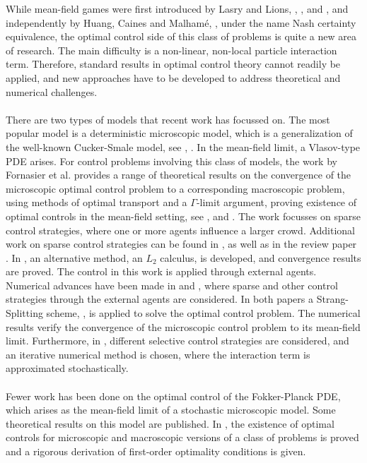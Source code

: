 While mean-field games were first introduced by Lasry and Lions, \cite{LASRY2006619}, \cite{LASRY2006679},\cite{LASRY4} and \cite{Lasry2007}, and independently by Huang, Caines and Malham\'e,  \cite{Huang1}, under the name Nash certainty equivalence, the optimal control side of this class of problems is quite a new area of research. The main difficulty is a non-linear, non-local particle interaction term. Therefore, standard results in optimal control theory cannot readily be applied, and new approaches have to be developed to address theoretical and numerical challenges.
\\
\\
There are two types of models that recent work has focussed on. The most popular model is a deterministic microscopic model, which is a generalization of the well-known Cucker-Smale model, see \cite{CuckerSmale1}, \cite{CuckerSmale2}. In the mean-field limit, a Vlasov-type PDE arises. For control problems involving this class of models, the work by Fornasier et al. provides a range of theoretical results on the convergence of the microscopic optimal control problem to a corresponding macroscopic problem, using methods of optimal transport and a $\Gamma$-limit argument, proving existence of optimal controls in the mean-field setting, see \cite{Fornasier_2014},
\cite{Fornasier_2014no2}
and \cite{fornasier_lisini_orrieri_savare_2019}. The work focusses on sparse control strategies, where one or more agents influence a larger crowd.
Additional work on sparse control strategies can be found in \cite{piccoli2014no1}, as well as in the review paper \cite{Fornasier_20161no1}.
In \cite{burger2019meanfield}, an alternative method, an $L_2$ calculus, is developed, and convergence results are proved. The control in this work is applied through external agents. 
\\
Numerical advances have been made in \cite{burger2019instantaneous} and \cite{burger2016controlling}, where sparse and other control strategies through the external agents are considered. In both papers a Strang-Splitting scheme, \cite{ChengC.Z1976Tiot}, is applied to solve the optimal control problem. The numerical results verify the convergence of the microscopic control problem to its mean-field limit.
Furthermore, in \cite{albi2016selective}, different selective control strategies are considered, and an iterative numerical method is chosen, where the interaction term is approximated stochastically.
\\
\\
Fewer work has been done on the optimal control of the Fokker-Planck PDE, which arises as the mean-field limit of a stochastic microscopic model. Some theoretical results on this model are published. In \cite{albi2016mean}, the existence of optimal controls for microscopic and macroscopic versions of a class of problems is proved and a rigorous derivation of first-order optimality conditions is given. 
